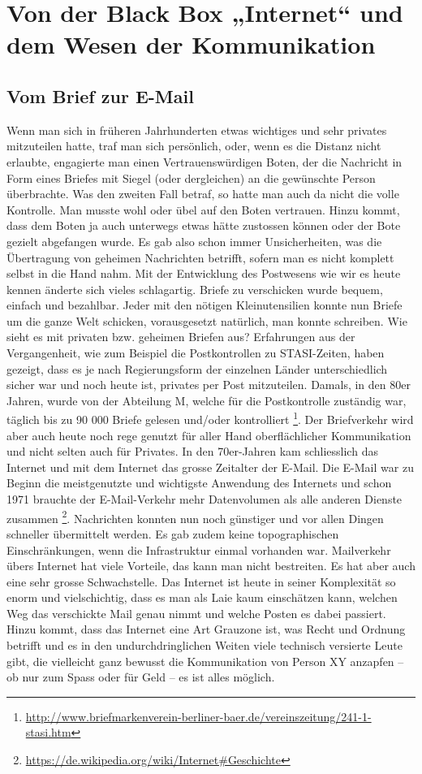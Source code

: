 \newpage
\section{Von der Black Box „Internet“ und dem Wesen der Kommunikation}
\subsection{Vom Brief zur E-Mail}
Wenn man sich in früheren Jahrhunderten etwas wichtiges und sehr privates mitzuteilen hatte, traf man sich persönlich, oder, wenn es die Distanz nicht erlaubte, engagierte man einen Vertrauenswürdigen Boten, der die Nachricht in Form eines Briefes mit Siegel (oder dergleichen) an die gewünschte Person überbrachte. Was den zweiten Fall betraf, so hatte man auch da nicht die volle Kontrolle. Man musste wohl oder übel auf den Boten vertrauen. Hinzu kommt, dass dem Boten ja auch unterwegs etwas hätte zustossen können oder der Bote gezielt abgefangen wurde. Es gab also schon immer Unsicherheiten, was die Übertragung von geheimen Nachrichten betrifft, sofern man es nicht komplett selbst in die Hand nahm. Mit der Entwicklung des Postwesens wie wir es heute kennen änderte sich vieles schlagartig. Briefe zu verschicken wurde bequem, einfach und bezahlbar. Jeder mit den nötigen Kleinutensilien konnte nun Briefe um die ganze Welt schicken, vorausgesetzt natürlich, man konnte schreiben. Wie sieht es mit privaten bzw. geheimen Briefen aus? Erfahrungen aus der Vergangenheit, wie zum Beispiel die Postkontrollen zu STASI-Zeiten, haben gezeigt, dass es je nach Regierungsform der einzelnen Länder unterschiedlich sicher war und noch heute ist, privates per Post mitzuteilen. Damals, in den 80er Jahren, wurde von der Abteilung M, welche für die Postkontrolle zuständig war, täglich bis zu 90 000 Briefe gelesen und/oder kontrolliert
\footnote{\url{http://www.briefmarkenverein-berliner-baer.de/vereinszeitung/241-1-stasi.htm}}.
Der Briefverkehr wird aber auch heute noch rege genutzt für aller Hand oberflächlicher Kommunikation und nicht selten auch für Privates. In den 70er-Jahren kam schliesslich das Internet und mit dem Internet das grosse Zeitalter der E-Mail. Die E-Mail war zu Beginn die meistgenutzte und wichtigste Anwendung des Internets und schon 1971 brauchte der E-Mail-Verkehr mehr Datenvolumen als alle anderen Dienste zusammen
\footnote{\url{https://de.wikipedia.org/wiki/Internet\#Geschichte}}.
Nachrichten konnten nun noch günstiger und vor allen Dingen schneller übermittelt werden. Es gab zudem keine topographischen Einschränkungen, wenn die Infrastruktur einmal vorhanden war. Mailverkehr übers Internet hat viele Vorteile, das kann man nicht bestreiten. Es hat aber auch eine sehr grosse Schwachstelle. Das Internet ist heute in seiner Komplexität so enorm und vielschichtig, dass es man als Laie kaum einschätzen kann, welchen Weg das verschickte Mail genau nimmt und welche Posten es dabei passiert. Hinzu kommt, dass das Internet eine Art Grauzone ist, was Recht und Ordnung betrifft und es in den undurchdringlichen Weiten viele technisch versierte Leute gibt, die vielleicht ganz bewusst die Kommunikation von Person XY anzapfen – ob nur zum Spass oder für Geld – es ist alles möglich.

